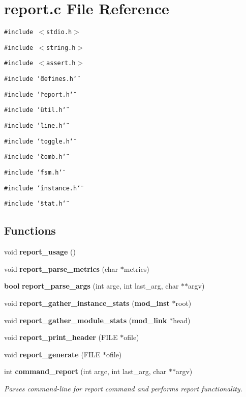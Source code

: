 \section{report.c File Reference}
\label{report_8c}
{\tt \#include $<$stdio.h$>$}\par
{\tt \#include $<$string.h$>$}\par
{\tt \#include $<$assert.h$>$}\par
{\tt \#include \char`\"{}defines.h\char`\"{}}\par
{\tt \#include \char`\"{}report.h\char`\"{}}\par
{\tt \#include \char`\"{}util.h\char`\"{}}\par
{\tt \#include \char`\"{}line.h\char`\"{}}\par
{\tt \#include \char`\"{}toggle.h\char`\"{}}\par
{\tt \#include \char`\"{}comb.h\char`\"{}}\par
{\tt \#include \char`\"{}fsm.h\char`\"{}}\par
{\tt \#include \char`\"{}instance.h\char`\"{}}\par
{\tt \#include \char`\"{}stat.h\char`\"{}}\par
\subsection*{Functions}
\begin{CompactItemize}
\item 
void {\bf report\_\-usage} ()
\item 
void {\bf report\_\-parse\_\-metrics} (char $\ast$metrics)
\item 
{\bf bool} {\bf report\_\-parse\_\-args} (int argc, int last\_\-arg, char $\ast$$\ast$argv)
\item 
void {\bf report\_\-gather\_\-instance\_\-stats} ({\bf mod\_\-inst} $\ast$root)
\item 
void {\bf report\_\-gather\_\-module\_\-stats} ({\bf mod\_\-link} $\ast$head)
\item 
void {\bf report\_\-print\_\-header} (FILE $\ast$ofile)
\item 
void {\bf report\_\-generate} (FILE $\ast$ofile)
\item 
int {\bf command\_\-report} (int argc, int last\_\-arg, char $\ast$$\ast$argv)
\begin{CompactList}\small\item\em Parses command-line for report command and performs report functionality.\item\end{CompactList}\end{CompactItemize}
